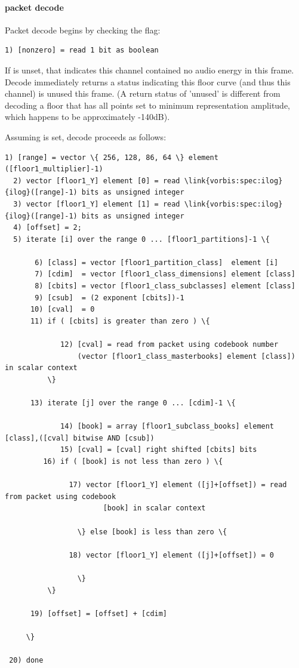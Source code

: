 \paragraph{packet decode} \label{vorbis:spec:floor1-decode}

Packet decode begins by checking the \varname{[nonzero]} flag:

\begin{Verbatim}[commandchars=\\\{\}]
  1) [nonzero] = read 1 bit as boolean
\end{Verbatim}

If \varname{[nonzero]} is unset, that indicates this channel contained
no audio energy in this frame.  Decode immediately returns a status
indicating this floor curve (and thus this channel) is unused this
frame.  (A return status of 'unused' is different from decoding a
floor that has all points set to minimum representation amplitude,
which happens to be approximately -140dB).


Assuming \varname{[nonzero]} is set, decode proceeds as follows:

\begin{Verbatim}[commandchars=\\\{\}]
  1) [range] = vector \{ 256, 128, 86, 64 \} element ([floor1_multiplier]-1)
  2) vector [floor1_Y] element [0] = read \link{vorbis:spec:ilog}{ilog}([range]-1) bits as unsigned integer
  3) vector [floor1_Y] element [1] = read \link{vorbis:spec:ilog}{ilog}([range]-1) bits as unsigned integer
  4) [offset] = 2;
  5) iterate [i] over the range 0 ... [floor1_partitions]-1 \{

       6) [class] = vector [floor1_partition_class]  element [i]
       7) [cdim]  = vector [floor1_class_dimensions] element [class]
       8) [cbits] = vector [floor1_class_subclasses] element [class]
       9) [csub]  = (2 exponent [cbits])-1
      10) [cval]  = 0
      11) if ( [cbits] is greater than zero ) \{

             12) [cval] = read from packet using codebook number
                 (vector [floor1_class_masterbooks] element [class]) in scalar context
          \}

      13) iterate [j] over the range 0 ... [cdim]-1 \{

             14) [book] = array [floor1_subclass_books] element [class],([cval] bitwise AND [csub])
             15) [cval] = [cval] right shifted [cbits] bits
	     16) if ( [book] is not less than zero ) \{

	           17) vector [floor1_Y] element ([j]+[offset]) = read from packet using codebook
                       [book] in scalar context

                 \} else [book] is less than zero \{

	           18) vector [floor1_Y] element ([j]+[offset]) = 0

                 \}
          \}

      19) [offset] = [offset] + [cdim]

     \}

 20) done
\end{Verbatim}

